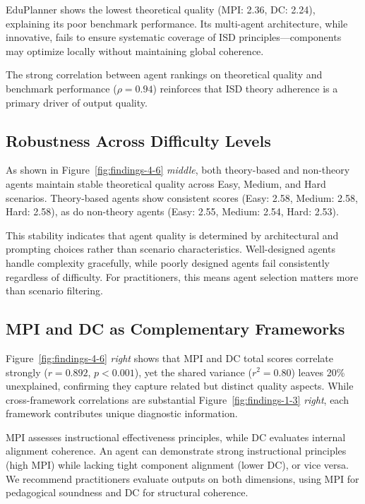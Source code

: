 EduPlanner shows the lowest theoretical quality (MPI: 2.36, DC: 2.24), explaining its poor benchmark performance. Its multi-agent architecture, while innovative, fails to ensure systematic coverage of ISD principles---components may optimize locally without maintaining global coherence.

The strong correlation between agent rankings on theoretical quality and benchmark performance ($\rho = 0.94$) reinforces that ISD theory adherence is a primary driver of output quality.

\subsection{Robustness Across Difficulty Levels}

As shown in Figure~\ref{fig:findings-4-6} \textit{middle}, both theory-based and non-theory agents maintain stable theoretical quality across Easy, Medium, and Hard scenarios. Theory-based agents show consistent scores (Easy: 2.58, Medium: 2.58, Hard: 2.58), as do non-theory agents (Easy: 2.55, Medium: 2.54, Hard: 2.53).

This stability indicates that agent quality is determined by architectural and prompting choices rather than scenario characteristics. Well-designed agents handle complexity gracefully, while poorly designed agents fail consistently regardless of difficulty. For practitioners, this means agent selection matters more than scenario filtering.

\subsection{MPI and DC as Complementary Frameworks}

Figure~\ref{fig:findings-4-6} \textit{right} shows that MPI and DC total scores correlate strongly ($r = 0.892$, $p < 0.001$), yet the shared variance ($r^2 = 0.80$) leaves 20\% unexplained, confirming they capture related but distinct quality aspects. While cross-framework correlations are substantial Figure~\ref{fig:findings-1-3} \textit{right}, each framework contributes unique diagnostic information.

MPI assesses instructional effectiveness principles, while DC evaluates internal alignment coherence. An agent can demonstrate strong instructional principles (high MPI) while lacking tight component alignment (lower DC), or vice versa. We recommend practitioners evaluate outputs on both dimensions, using MPI for pedagogical soundness and DC for structural coherence.

